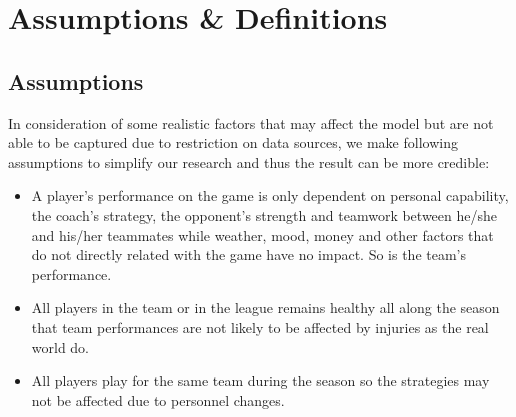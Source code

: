 \documentclass{mcmthesis}
\begin{document}
\section{Assumptions \& Definitions}
\subsection{Assumptions}
In consideration of some realistic factors that may affect the model but are not able to be captured due to restriction on data sources, we make following assumptions to simplify our research and thus the result can be more credible:
\begin{itemize}
  \item A player's performance on the game is only dependent on personal capability, the coach's strategy, the opponent's strength and teamwork between he/she and his/her teammates while weather, mood, money and other factors that do not directly related with the game have no impact. So is the team's performance. 
  \item All players in the team or in the league remains healthy all along the season that team performances are not likely to be affected by injuries as the real world do.
  \item All players play for the same team during the season so the strategies may not be affected due to personnel changes.
\end{itemize}
\end{document}
